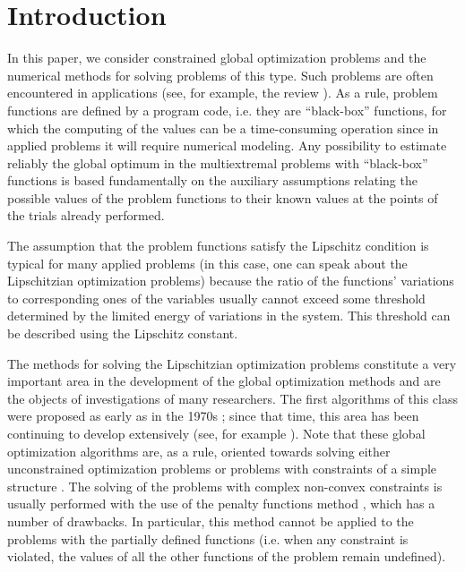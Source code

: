 \documentclass[preprint]{elsarticle}
\begin{document}
\section{Introduction}
	In this paper, we consider constrained global optimization problems and the numerical methods for solving problems of this type. Such problems are often encountered in applications (see, for example, the review \cite{Pinter2006}). As a rule, problem functions are defined by a program code, i.e. they are ``black-box'' functions, for which the computing of the values can be a time-consuming operation since in applied problems it will require  numerical modeling. Any  possibility to estimate reliably the global optimum in the multiextremal problems with ``black-box'' functions is based fundamentally on the auxiliary assumptions relating the possible values of the problem functions to their known values at the points of the trials already performed.
	
	The assumption that the problem functions satisfy the Lipschitz condition is typical for many applied problems (in this case, one can speak about the Lipschitzian optimization problems) because the ratio of the functions’ variations to corresponding ones of the variables usually cannot exceed some threshold determined by the limited energy of variations in the system. This threshold can be described using the Lipschitz constant.
	
	The methods for solving the Lipschitzian optimization problems constitute a very important area in the development of the global optimization methods and are the objects of investigations of many researchers. The first algorithms of this class were proposed as early as in the 1970s \cite{Evtushenko1971, Piyavskii1972, Shubert1972, Strongin1970}; since that time, this area has been continuing to develop extensively (see, for example \cite{Evtushenko2009, Evtushenko2013, Strongin2000, Sergeyev2013, Jones2009}). Note that these global optimization algorithms are, as a rule, oriented towards solving either  unconstrained optimization problems 
	\cite{Paulavicius2014, Sergeyev2015, Pinter1996, Jones1993, Gablonsky2001}
or problems with constraints of a simple structure \cite{Vaz2009, Paulavicius2016}. The solving of the problems with complex non-convex constraints is usually performed with the use of the penalty functions method \cite{Stripinis2019, Pillo2012, Pillo2016}, which has a number of drawbacks.  In particular, this method cannot be applied to the problems with the partially defined functions (i.e. when any constraint is violated, the values of all the other functions of the problem remain undefined).
	
\end{document}
